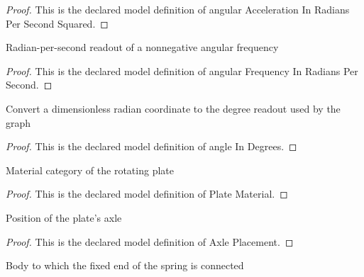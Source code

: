 \begin{proof}
  This is the declared model definition of angular Acceleration In Radians Per Second Squared.
\end{proof}
\begin{definition}
  \label{def:physics:phyx-mini-0269:phyxminiproblems-problemphyxmini0269-angularfrequencyinradianspersecond}
  Radian-per-second readout of a nonnegative angular frequency
\end{definition}
\begin{proof}
  This is the declared model definition of angular Frequency In Radians Per Second.
\end{proof}
\begin{definition}
  \label{def:physics:phyx-mini-0269:phyxminiproblems-problemphyxmini0269-angleindegrees}
  Convert a dimensionless radian coordinate to the degree readout used by the graph
\end{definition}
\begin{proof}
  This is the declared model definition of angle In Degrees.
\end{proof}
\begin{definition}
  \label{def:physics:phyx-mini-0269:phyxminiproblems-problemphyxmini0269-platematerial}
  Material category of the rotating plate
\end{definition}
\begin{proof}
  This is the declared model definition of Plate Material.
\end{proof}
\begin{definition}
  \label{def:physics:phyx-mini-0269:phyxminiproblems-problemphyxmini0269-axleplacement}
  Position of the plate's axle
\end{definition}
\begin{proof}
  This is the declared model definition of Axle Placement.
\end{proof}
\begin{definition}
  \label{def:physics:phyx-mini-0269:phyxminiproblems-problemphyxmini0269-springanchor}
  Body to which the fixed end of the spring is connected
\end{definition}
